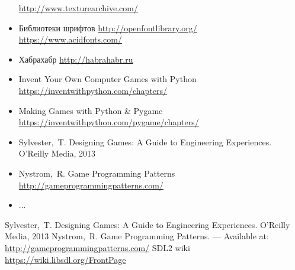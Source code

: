 \begin{itemize}
        \url{http://www.texturearchive.com/}
    \item Библиотеки шрифтов \url{http://openfontlibrary.org/}\\
        \url{https://www.acidfonts.com/}
    \item Хабрахабр \url{http://habrahabr.ru}
    \item Invent Your Own Computer Games with Python\\
        \url{https://inventwithpython.com/chapters/}
    \item Making Games with Python \& Pygame\\
        \url{https://inventwithpython.com/pygame/chapters/}
    \item Sylvester,~T. Designing Games: A Guide to Engineering Experiences. O'Reilly Media, 2013
    \item Nystrom,~R. Game Programming Patterns \url{http://gameprogrammingpatterns.com/}
    \item ...
\end{itemize}

\renewcommand{\bibname}{Список используемой литературы}
\begin{thebibliography}{10}
     Sylvester,~T. Designing Games: A Guide to Engineering Experiences. O'Reilly Media, 2013 
     Nystrom,~R. Game Programming Patterns. --- Available at: 
        \url{http://gameprogrammingpatterns.com/}
     SDL2 wiki \url{https://wiki.libsdl.org/FrontPage}
\end{thebibliography}